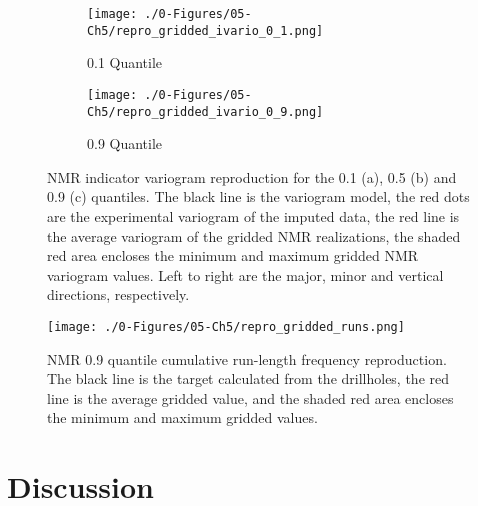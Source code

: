 \begin{figure}
    \begin{subfigure}{1.0\textwidth}
        \centering
        \texttt{[image: ./0-Figures/05-Ch5/repro\_gridded\_ivario\_0\_1.png]}
        \caption{0.1 Quantile}
    \end{subfigure}
    \begin{subfigure}{1.0\textwidth}
        \centering
        \texttt{[image: ./0-Figures/05-Ch5/repro\_gridded\_ivario\_0\_9.png]}
        \caption{0.9 Quantile}
    \end{subfigure}
    \caption{\gls{NMR} indicator variogram reproduction for the 0.1 (a), 0.5 (b) and 0.9 (c) quantiles. The black line is the variogram model, the red dots are the experimental variogram of the imputed data, the red line is the average variogram of the gridded \gls{NMR} realizations, the shaded red area encloses the minimum and maximum gridded \gls{NMR} variogram values. Left to right are the major, minor and vertical directions, respectively.}
    \label{fig:repro_gridded_ivario_ch5}
\end{figure}

\begin{figure}[htb!]
    \centering
    \texttt{[image: ./0-Figures/05-Ch5/repro\_gridded\_runs.png]}
    \caption{\gls{NMR} 0.9 quantile cumulative run-length frequency reproduction. The black line is the target calculated from the drillholes, the red line is the average gridded value, and the shaded red area encloses the minimum and maximum gridded values. }
    \label{fig:repro_gridded_runs_ch5}
\end{figure}

\FloatBarrier
\section{Discussion}
\label{sec:discuss05}